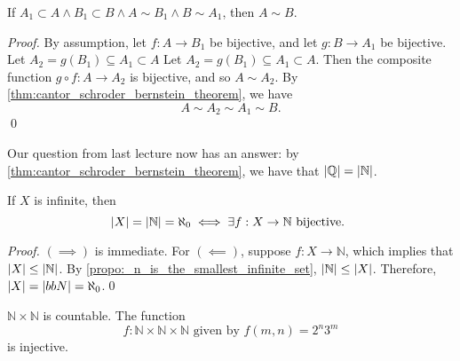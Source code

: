 \documentclass[notoc,notitlepage]{tufte-book}
\begin{document}
\begin{crly}
\label{crly:cantor_schroder_bernstein_theorem_restated}
  If $A_1 \subset A \land B_1 \subset B \land A \sim B_1 \land B \sim A_1$, then $A \sim B$.
\end{crly}

\begin{proof}
  By assumption, let $f : A \to B_1$ be bijective, and let $g : B \to A_1$ be bijective. Let $A_2 = g(B_1) \subseteq A_1 \subset A$ Let $A_2 = g(B_1) \subseteq A_1 \subset A$. Then the composite function $g \circ f : A \to A_2$ is bijective, and so $A \sim A_2$. By \cref{thm:cantor_schroder_bernstein_theorem}, we have
  \begin{equation*}
    A \sim A_2 \sim A_1 \sim B.
  \end{equation*}\qed
\end{proof}

\begin{eg}
  Our question from last lecture now has an answer: by \cref{thm:cantor_schroder_bernstein_theorem}, we have that $\left|\mathbb{Q}\right| = \left|\mathbb{N}\right|$.
\end{eg}

\begin{propo}
\label{propo:denumerability_check}
  If $X$ is infinite, then
  \begin{equation*}
    \left|X\right| = \left|\mathbb{N}\right| = \aleph_0 \iff \exists f : X \to \mathbb{N} \text{ bijective. }
  \end{equation*}
\end{propo}

\begin{proof}
  $(\implies)$ is immediate. For $(\impliedby)$, suppose $f : X \to \mathbb{N}$, which implies that $\left|X\right| \leq \left|\mathbb{N}\right|$. By \cref{propo:_n_is_the_smallest_infinite_set}, $\left|\mathbb{N}\right| \leq \left|X\right|$. Therefore, $\left|X\right| = \left|bbN\right| = \aleph_0$.\qed
\end{proof}

\begin{eg}
  $\mathbb{N} \times \mathbb{N}$ is countable. The function
  \begin{equation*}
    f : \mathbb{N} \times \mathbb{N} \times \mathbb{N} \text{ given by } f(m, n) = 2^n 3^m
  \end{equation*}
  is injective.
\end{eg}
\end{document}
